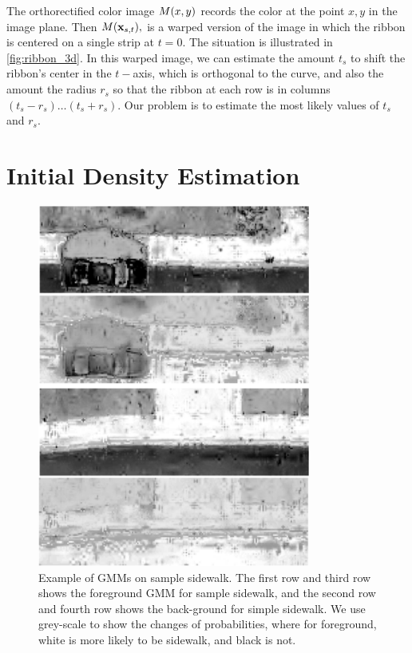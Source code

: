 The orthorectified color image $M(x,y)$
records the color at the point $x,y$ in the image plane.
Then $M(\mathbf{x}_{s,t}),$ is a warped version of the image in which the ribbon is centered on a single strip at $t=0$.
The situation is illustrated in \ref{fig:ribbon_3d}.  
In this warped image, we can estimate the amount $t_s$ to shift the ribbon's center in the $t-$axis, which is orthogonal to the curve,  and also the amount the radius $r_s$ so that the  ribbon at each row is in columns $(t_s - r_s)\dots(t_s+r_s)$.  
Our problem is to estimate the most likely values of $t_s$ and $r_s$.  


\section{Initial Density Estimation}

\begin{figure}[H]
    \centering
    \includegraphics[width=0.8\textwidth]{Figures/GMM_needed.png}
    \caption[\ac{GMM} Result 1]{Example of GMMs on sample sidewalk. The first row and third row shows the foreground GMM for sample sidewalk, and the second row and fourth row shows the back-ground for simple sidewalk. We use grey-scale to show the changes of probabilities, where for foreground, white is more likely to be sidewalk, and black is not.}
    \label{fig:GMM_result}
\end{figure}


